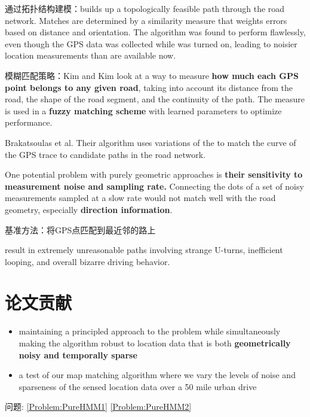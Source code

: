 通过拓扑结构建模：builds up a
topologically feasible path through the road network. Matches are
determined by a similarity measure that weights errors based on
distance and orientation. The algorithm was found to perform flawlessly, even though the GPS data was collected while
 was turned on, leading to noisier location
measurements than are available now.

模糊匹配策略：Kim and Kim look at a
way to measure \textbf{how much each GPS point belongs to any given road}, taking into account its distance from the road, the shape of
the road segment, and the continuity of the path. The measure is
used in a \textbf{fuzzy matching scheme} with learned parameters to
optimize performance.

Brakatsoulas et al. Their
algorithm uses variations of the  to match the
curve of the GPS trace to candidate paths in the road network.

\begin{remark}
    One potential problem with purely geometric approaches is \textbf{their
sensitivity to measurement noise and sampling rate.} 
Connecting the dots of a set of noisy measurements sampled at a
slow rate would not match well with the road geometry, especially
\textbf{direction information}.
\end{remark}

基准方法：将GPS点匹配到最近邻的路上

\begin{remark}
    result in extremely unreasonable paths involving strange U-turns, inefficient looping, and overall bizarre driving
behavior.
\end{remark}

\section{论文贡献}

\begin{itemize}
    \item maintaining a principled approach to the problem while simultaneously making the algorithm robust to location data that is both \textbf{geometrically noisy and temporally sparse}
    \item a test of our map matching algorithm where we vary the levels of noise and sparseness of the sensed location data over a 50 mile urban drive
\end{itemize}

\begin{remark}
   问题: \ref{Problem:PureHMM1} \ref{Problem:PureHMM2} 
\end{remark}

